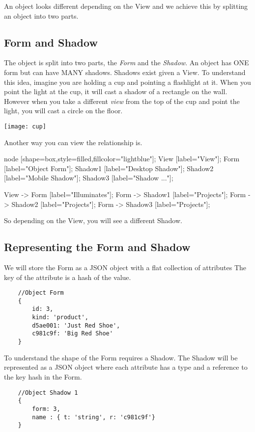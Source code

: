 \documentclass[11pt]{article}
\begin{document}
An object looks different depending on the View and we achieve this by splitting an 
object into two parts. 

\subsection{Form and Shadow}

The object is split into two parts, the \emph{Form} and the \emph{Shadow}. 
An object has ONE form but can have MANY shadows. Shadows exist given a View. 
To understand this idea, imagine you are holding a cup and pointing a flashlight at it. 
When you point the light at the cup, it will cast a shadow of a rectangle on the wall. 
However when you take a different \emph{view} from the top of the cup and point the light, 
you will cast a circle on the floor.

\texttt{[image: cup]}

Another way you can view the relationship is.

 {
    node [shape=box,style=filled,fillcolor="lightblue"];
    View [label="View"];
    Form [label="Object Form"];
    Shadow1 [label="Desktop Shadow"];
    Shadow2 [label="Mobile Shadow"];
    Shadow3 [label="Shadow ..."];

    View -> Form [label="Illuminates"];
    Form -> Shadow1 [label="Projects"];
    Form -> Shadow2 [label="Projects"];
    Form -> Shadow3 [label="Projects"];
}

So depending on the View, you will see a different Shadow.

\subsection{Representing the Form and Shadow}

We will store the Form as a JSON object with a flat collection of attributes 
The key of the attribute is a hash of the value.

\begin{lstlisting}
    //Object Form
    {
        id: 3,
        kind: 'product',
        d5ae001: 'Just Red Shoe', 
        c981c9f: 'Big Red Shoe'
    }
\end{lstlisting}

To understand the shape of the Form requires a Shadow. The Shadow will be
represented as a JSON object where each attribute has a type and a reference
to the key hash in the Form.

\begin{lstlisting}
    //Object Shadow 1
    {
        form: 3,
        name : { t: 'string', r: 'c981c9f'}
    }
\end{lstlisting}
\end{document}

